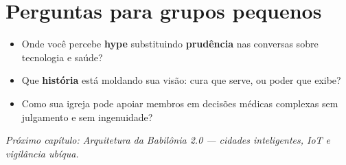 \section{Perguntas para grupos pequenos}
\begin{itemize}[leftmargin=*,noitemsep]
  \item Onde você percebe \textbf{hype} substituindo \textbf{prudência} nas conversas sobre tecnologia e saúde?
  \item Que \textbf{história} está moldando sua visão: cura que serve, ou poder que exibe?
  \item Como sua igreja pode apoiar membros em decisões médicas complexas sem julgamento e sem ingenuidade?
\end{itemize}

\bigskip
\noindent\textit{Próximo capítulo: Arquitetura da Babilônia 2.0 --- cidades inteligentes, IoT e vigilância ubíqua.}
